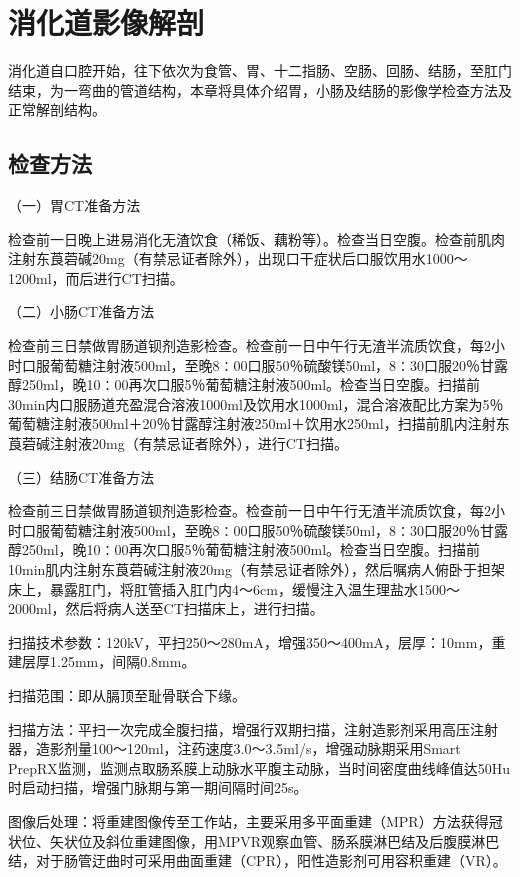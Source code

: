 \chapter{消化道影像解剖}

消化道自口腔开始，往下依次为食管、胃、十二指肠、空肠、回肠、结肠，至肛门结束，为一弯曲的管道结构，本章将具体介绍胃，小肠及结肠的影像学检查方法及正常解剖结构。

\section{检查方法}

（一）胃CT准备方法

检查前一日晚上进易消化无渣饮食（稀饭、藕粉等）。检查当日空腹。检查前肌肉注射东莨菪碱20mg（有禁忌证者除外），出现口干症状后口服饮用水1000～1200ml，而后进行CT扫描。

（二）小肠CT准备方法

检查前三日禁做胃肠道钡剂造影检查。检查前一日中午行无渣半流质饮食，每2小时口服葡萄糖注射液500ml，至晚8∶00口服50％硫酸镁50ml，8∶30口服20％甘露醇250ml，晚10∶00再次口服5％葡萄糖注射液500ml。检查当日空腹。扫描前30min内口服肠道充盈混合溶液1000ml及饮用水1000ml，混合溶液配比方案为5％葡萄糖注射液500ml＋20％甘露醇注射液250ml＋饮用水250ml，扫描前肌内注射东莨菪碱注射液20mg（有禁忌证者除外），进行CT扫描。

（三）结肠CT准备方法

检查前三日禁做胃肠道钡剂造影检查。检查前一日中午行无渣半流质饮食，每2小时口服葡萄糖注射液500ml，至晚8∶00口服50％硫酸镁50ml，8∶30口服20％甘露醇250ml，晚10∶00再次口服5％葡萄糖注射液500ml。检查当日空腹。扫描前10min肌内注射东莨菪碱注射液20mg（有禁忌证者除外），然后嘱病人俯卧于担架床上，暴露肛门，将肛管插入肛门内4～6cm，缓慢注入温生理盐水1500～2000ml，然后将病人送至CT扫描床上，进行扫描。

扫描技术参数：120kV，平扫250～280mA，增强350～400mA，层厚：10mm，重建层厚1.25mm，间隔0.8mm。

扫描范围：即从膈顶至耻骨联合下缘。

扫描方法：平扫一次完成全腹扫描，增强行双期扫描，注射造影剂采用高压注射器，造影剂量100～120ml，注药速度3.0～3.5ml/s，增强动脉期采用Smart
PrepRX监测，监测点取肠系膜上动脉水平腹主动脉，当时间密度曲线峰值达50Hu时启动扫描，增强门脉期与第一期间隔时间25s。

图像后处理：将重建图像传至工作站，主要采用多平面重建（MPR）方法获得冠状位、矢状位及斜位重建图像，用MPVR观察血管、肠系膜淋巴结及后腹膜淋巴结，对于肠管迂曲时可采用曲面重建（CPR），阳性造影剂可用容积重建（VR）。


